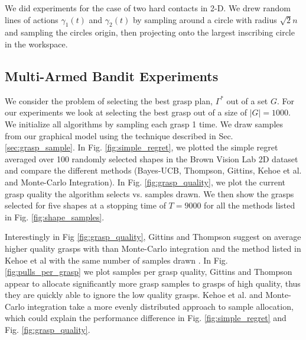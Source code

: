 \documentclass[journal,transmag]{IEEEtran}%
\begin{document}
We did experiments for the case of two hard contacts in 2-D. We drew random lines of actions $\gamma_1(t)$ and $\gamma_2(t)$ by sampling around a circle with radius $\sqrt{2}n$ and sampling the circles origin, then projecting onto the largest inscribing circle in the workspace. 

\subsection{Multi-Armed Bandit Experiments}
We consider the problem of selecting the best grasp plan, $\Gamma^*$ out of a set $G$. For our experiments we look at selecting the best grasp out of a size of $|G| = 1000$. We initialize all algorithms by sampling each grasp 1 time. We draw samples from our graphical model using the technique described in Sec.  \ref{sec:grasp_sample}. In Fig. \ref{fig:simple_regret}, we plotted the simple regret averaged over 100 randomly selected shapes in the Brown Vision Lab 2D dataset and compare the different methods (Bayes-UCB, Thompson, Gittins, Kehoe et al. \cite{kehoe2012toward} and Monte-Carlo Integration).  In Fig. \ref{fig:grasp_quality}, we plot the current grasp quality the algorithm selects vs. samples drawn.  We then show the grasps selected for five shapes at a stopping time of $T = 9000$ for all the methods listed in Fig. \ref{fig:shape_samples}.

  Interestingly in Fig \ref{fig:grasp_quality}, Gittins and Thompson suggest on average higher quality grasps with  than Monte-Carlo integration and the method listed in Kehoe et al \cite{kehoe2012toward} with the same number of samples drawn . In Fig. \ref{fig:pulls_per_grasp} we plot samples per grasp quality, Gittins and Thompson appear to allocate significantly more grasp samples to grasps of high quality, thus they are quickly able to ignore the low quality grasps. Kehoe et al. and Monte-Carlo integration take a more evenly distributed approach to sample allocation, which could explain the performance difference in Fig. \ref{fig:simple_regret} and Fig. \ref{fig:grasp_quality}.
\end{document}
